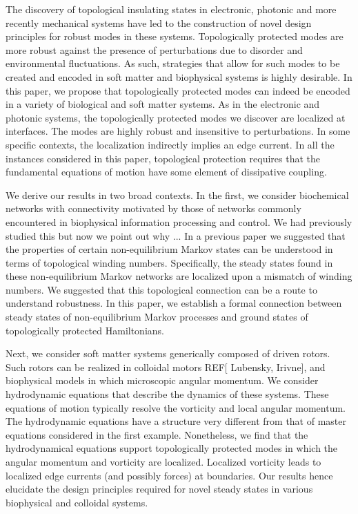 \documentclass[amsmath,preprintnumbers,10pt,twocolumn,prl]{revtex4-1}
\begin{document}
The discovery of topological insulating states in electronic, photonic and more recently mechanical systems have led to the construction of novel design principles for robust modes in these systems. Topologically protected modes are more robust against the presence of perturbations due to disorder and environmental fluctuations. As such, strategies that allow for such modes to be created and encoded in soft matter and biophysical systems is highly desirable. In this paper, we propose that topologically protected modes can indeed be encoded in a variety of biological and soft matter systems. As in the electronic and photonic systems, the topologically protected modes we discover are localized at interfaces. The modes are highly robust and insensitive to perturbations. 
In some specific contexts, the localization indirectly implies an edge current. In all the instances considered in this paper, topological protection requires that the fundamental equations of motion have some element of dissipative coupling. 


We derive our results in two broad contexts. In the first, we consider biochemical networks with connectivity motivated by those of networks commonly encountered in biophysical information processing and control. We had previously studied this but now we point out why ... 
In a previous paper we suggested that the properties of certain non-equilibrium Markov states can be understood in terms of topological winding numbers. Specifically, the steady states found in these non-equilibrium Markov networks are localized upon a mismatch of winding numbers. We suggested that this topological connection can be a route to understand robustness. In this paper, we establish a formal connection between steady states of non-equilibrium Markov processes and ground states of topologically protected Hamiltonians. 

Next, we consider soft matter systems generically composed of driven rotors. Such rotors can be realized in colloidal motors REF[ Lubensky, Irivne], and biophysical models in which microscopic angular momentum. We consider hydrodynamic equations that describe the dynamics of these systems. These equations of motion typically resolve the vorticity and local angular momentum. The hydrodynamic equations have a structure very different from that of master equations considered in the first example. Nonetheless, we find that the hydrodynamical equations support topologically protected modes in which the angular momentum and vorticity are localized. Localized vorticity leads to localized edge currents (and possibly forces) at boundaries. Our results hence elucidate the design principles required for novel steady states in various biophysical and colloidal systems. 
\end{document}
